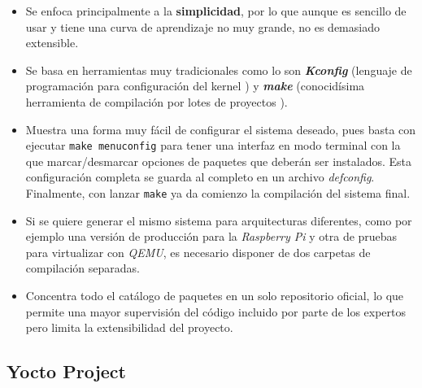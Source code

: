 \begin{itemize}
	\item Se enfoca principalmente a la \textbf{simplicidad}, por lo que aunque es sencillo de usar y tiene una curva de aprendizaje no muy grande, no es demasiado extensible.
	\item Se basa en herramientas muy tradicionales como lo son  \textbf{\textit{Kconfig}} (lenguaje de programación para configuración del kernel \cite{kconfig}) y \textbf{\textit{make}} (conocidísima herramienta de compilación por lotes de proyectos \cite{make-tool}).
	\item Muestra una forma muy fácil de configurar el sistema deseado, pues basta con ejecutar \texttt{make menuconfig} para tener una interfaz en modo terminal con la que marcar/desmarcar opciones de paquetes que deberán ser instalados. Esta configuración completa se guarda al completo en un archivo \textit{defconfig}. Finalmente, con lanzar \texttt{make} ya da comienzo la compilación del sistema final.
	\item Si se quiere generar el mismo sistema para arquitecturas diferentes, como por ejemplo una versión de producción para la \textit{Raspberry Pi} y otra de pruebas para virtualizar con \textit{QEMU}, es necesario disponer de dos carpetas de compilación separadas.
	\item Concentra todo el catálogo de paquetes en un solo repositorio oficial, lo que permite una mayor supervisión del código incluido por parte de los expertos pero limita la extensibilidad del proyecto.
\end{itemize}

\subsection{Yocto Project}

